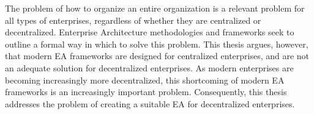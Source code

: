 The problem of how to organize an entire organization is a relevant problem for all types of enterprises, regardless of whether they are centralized or decentralized. Enterprise Architecture methodologies and frameworks seek to outline a formal way in which to solve this problem. This thesis argues, however, that modern EA frameworks are designed for centralized enterprises, and are not an adequate solution for decentralized enterprises. As modern enterprises are becoming increasingly more decentralized, this shortcoming of modern EA frameworks is an increasingly important problem. Consequently, this thesis addresses the problem of creating a suitable EA for decentralized enterprises.